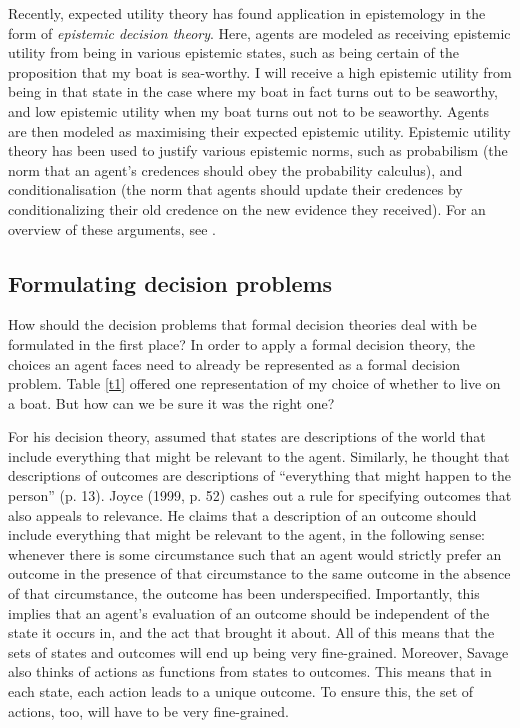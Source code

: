 Recently, expected utility theory has found application in epistemology in the form of {\em epistemic decision theory}. Here, agents are modeled as receiving epistemic utility from being in various epistemic states, such as being certain of the proposition that my boat is sea-worthy. I will receive a high epistemic utility from being in that state in the case where my boat in fact turns out to be seaworthy, and low epistemic utility when my boat turns out not to be seaworthy. Agents are then modeled as maximising their expected epistemic utility. Epistemic utility theory has been used to justify various epistemic norms, such as probabilism (the norm that an agent's credences should obey the probability calculus), and conditionalisation (the norm that agents should update their credences by conditionalizing their old credence on the new evidence they received). For an overview of these arguments, see \citet{Pettigrew2011}.

\subsection{Formulating decision problems}\label{subs14}

How should the decision problems that formal decision theories deal with be formulated in the first place? In order to apply a formal decision theory, the choices an agent faces need to already be represented as a formal decision problem. Table \ref{t1} offered one representation of my choice of whether to live on a boat. But how can we be sure it was the right one?

For his decision theory, \citet{Savage1954} assumed that states are descriptions of the world that include everything that might be relevant to the agent. Similarly, he thought that descriptions of outcomes are descriptions of ``everything that might happen to the person'' (p. 13). Joyce (1999, p. 52) cashes out a rule for specifying outcomes that also appeals to relevance. He claims that a description of an outcome should include everything that might be relevant to the agent, in the following sense: whenever there is some circumstance such that an agent would strictly prefer an outcome in the presence of that circumstance to the same outcome in the absence of that circumstance, the outcome has been underspecified. Importantly, this implies that an agent's evaluation of an outcome should be independent of the state it occurs in, and the act that brought it about. All of this means that the sets of states and outcomes will end up being very fine-grained. Moreover, Savage also thinks of actions as functions from states to outcomes. This means that in each state, each action leads to a unique outcome. To ensure this, the set of actions, too, will have to be very fine-grained.


